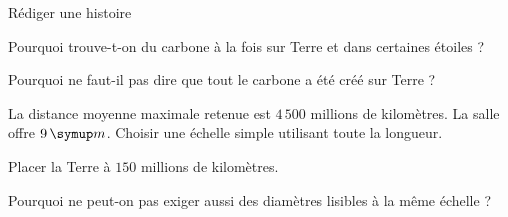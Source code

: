 \par\noindent\begin{minipage}{\linewidth}
\begin{exercice}[3]{Rédiger une histoire}
\begin{questions}
\item Pourquoi trouve-t-on du carbone à la fois sur Terre et dans certaines étoiles ?
\item Pourquoi ne faut-il pas dire que tout le carbone a été créé sur Terre ?
\end{questions}
\end{exercice}
\end{minipage}
\label{defi-ex-8}
\begin{questions}
\item La distance moyenne maximale retenue est $4\,500$ millions de kilomètres. La salle offre $9\unite m$. Choisir une échelle simple utilisant toute la longueur.
\item Placer la Terre à $150$ millions de kilomètres.
\item Pourquoi ne peut-on pas exiger aussi des diamètres lisibles à la même échelle ?
\end{questions}
\pcGrille
